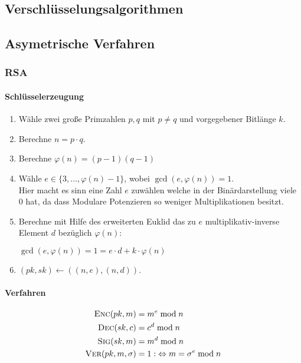 \documentclass[a4paper,landscape]{article}
\newcommand{\plaint}{\ensuremath{m}}
\newcommand{\ciphert}{\ensuremath{c}}
\newcommand{\skey}{\ensuremath{sk}}
\newcommand{\pkey}{\ensuremath{pk}}
\newcommand{\enc}{\textsc{Enc}}
\newcommand{\dec}{\textsc{Dec}}
\newcommand{\sig}{\textsc{Sig}}
\newcommand{\ver}{\textsc{Ver}}
\begin{document}
\begin{multicols*}{4}
	\section{Verschlüsselungsalgorithmen}
	\subsection{Asymetrische Verfahren}
	\subsubsection{RSA}
	\paragraph{Schlüsselerzeugung}
	\begin{enumerate}
		\item Wähle zwei große Primzahlen \(p, q\) mit \(p \neq q\) und
		      vorgegebener Bitlänge \(k\).
		\item Berechne \(n = p \cdot q\).
		\item Berechne \(\varphi(n) = (p - 1)(q - 1)\)
		\item Wähle \(e \in \{3, \dotsc, \varphi(n) - 1\}\), wobei
		      \(\gcd(e, \varphi(n)) = 1\). \\
		      Hier macht es sinn eine Zahl \(e\) zuwählen welche in der
		      Binärdarstellung viele \(0\) hat, da dass Modulare Potenzieren so
		      weniger Multiplikationen besitzt.
		\item Berechne mit Hilfe des erweiterten Euklid das zu \(e\)
		      multiplikativ-inverse Element \(d\) bezüglich
		      \(\varphi(n)\): \par
		      \(\gcd(e,\varphi(n)) = 1 = e \cdot d + k \cdot \varphi(n)\)
		\item \((\pkey, \skey) \leftarrow ((n,e), (n,d))\).
	\end{enumerate}

	\paragraph{Verfahren}
	\begin{align*}
		\enc(\pkey,\plaint)        & = \plaint^{e} \bmod n                               \\
		\dec(\skey,\ciphert)       & = \ciphert^{d} \bmod n                              \\
		\sig(\skey,\plaint)        & = \plaint^{d} \bmod n                               \\
		\ver(\pkey,\plaint,\sigma) & = 1 :\;\Leftrightarrow \plaint = \sigma^{e} \bmod n
	\end{align*}


\end{multicols*}
\end{document}
